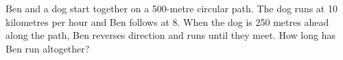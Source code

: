 Ben and a dog start together on a 500-metre circular path. The dog runs at 10 kilometres per hour and Ben follows at 8. When the dog is 250 metres ahead along the path, Ben reverses direction and runs until they meet. How long has Ben run altogether?
